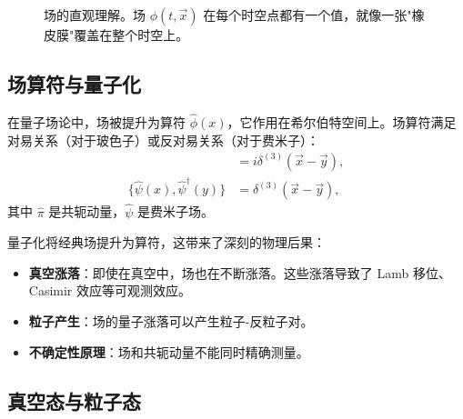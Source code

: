 \begin{figure}[htbp]
\centering
{}
\caption{场的直观理解。场 $\phi(t, \vec{x})$ 在每个时空点都有一个值，就像一张"橡皮膜"覆盖在整个时空上。}
\label{fig:field}
\end{figure}

\subsection{场算符与量子化}

在量子场论中，场被提升为算符 $\hat{\phi}(x)$，它作用在希尔伯特空间上。场算符满足对易关系（对于玻色子）或反对易关系（对于费米子）：
\begin{align}
    [\hat{\phi}(x), \hat{\pi}(y)] &= i\delta^{(3)}(\vec{x} - \vec{y}), \\
    \{\hat{\psi}(x), \hat{\psi}^\dagger(y)\} &= \delta^{(3)}(\vec{x} - \vec{y}),
\end{align}
其中 $\hat{\pi}$ 是共轭动量，$\hat{\psi}$ 是费米子场。

\begin{note}[量子化的物理意义]
量子化将经典场提升为算符，这带来了深刻的物理后果：
\begin{itemize}
    \item \textbf{真空涨落}：即使在真空中，场也在不断涨落。这些涨落导致了 Lamb 移位、Casimir 效应等可观测效应。
    \item \textbf{粒子产生}：场的量子涨落可以产生粒子-反粒子对。
    \item \textbf{不确定性原理}：场和共轭动量不能同时精确测量。
\end{itemize}
\end{note}

\subsection{真空态与粒子态}

